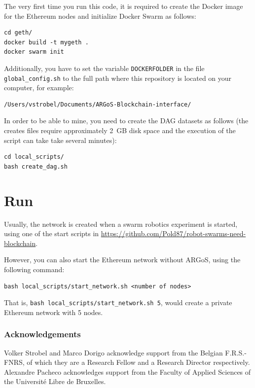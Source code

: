 \documentclass{article}
\begin{document}
The very first time you run this code, it is required to create the
Docker image for the Ethereum nodes and initialize Docker Swarm as
follows:

\begin{verbatim}
cd geth/
docker build -t mygeth .
docker swarm init
\end{verbatim}

Additionally, you have to set the variable \verb|DOCKERFOLDER| in the
file \verb|global_config.sh| to the full path where this repository is
located on your computer, for example:

\begin{verbatim}
/Users/vstrobel/Documents/ARGoS-Blockchain-interface/
\end{verbatim}

In order to be able to mine, you need to create the DAG datasets as
follows (the creates files require approximately 2~GB disk space and
the execution of the script can take take several minutes):

\begin{verbatim}
cd local_scripts/
bash create_dag.sh
\end{verbatim}

\section{Run}
Usually, the network is created when a swarm robotics experiment is
started, using one of the start scripts in
\url{https://github.com/Pold87/robot-swarms-need-blockchain}.

However, you can also start the Ethereum network without ARGoS, using
the following command:

\begin{verbatim}
bash local_scripts/start_network.sh <number of nodes>
\end{verbatim}

That is, \verb|bash local_scripts/start_network.sh 5|, would create a
private Ethereum network with 5 nodes.

\subsubsection*{Acknowledgements}

Volker Strobel and Marco Dorigo acknowledge support from the Belgian
F.R.S.-FNRS, of which they are a Research Fellow and a Research
Director respectively. Alexandre Pacheco acknowledges support from the
Faculty of Applied Sciences of the Universit\'{e} Libre de Bruxelles.


%

\end{document}
